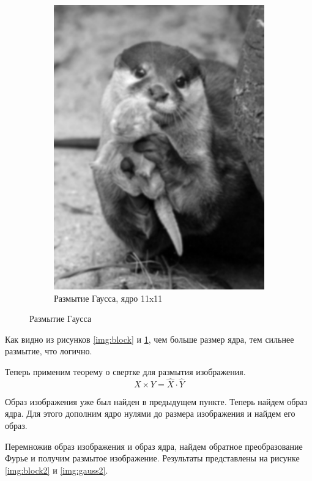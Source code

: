 \begin{figure}[ht!]
\begin{subfigure}[b]{0.5\linewidth}
        \includegraphics[width=0.95\linewidth]{gaussian_11.png}
        \caption{Размытие Гаусса, ядро 11x11}
    \end{subfigure}
    \caption{Размытие Гаусса}
    \label{img:gauss}
\end{figure}

Как видно из рисунков \ref{img:block} и \ref{img:gauss}, чем больше размер ядра, тем сильнее размытие, что логично.

Теперь применим теорему о свертке для размытия изображения.
\begin{equation}
    X \times Y = \hat{X} \cdot \hat{Y}
\end{equation}

Образ изображения уже был найден в предыдущем пункте. Теперь найдем образ ядра. Для этого дополним 
ядро нулями до размера изображения и найдем его образ. 

Перемножив образ изображения и образ ядра, найдем обратное преобразование Фурье и получим размытое изображение. Результаты представлены на рисунке \ref{img:block2} и \ref{img:gauss2}. 

